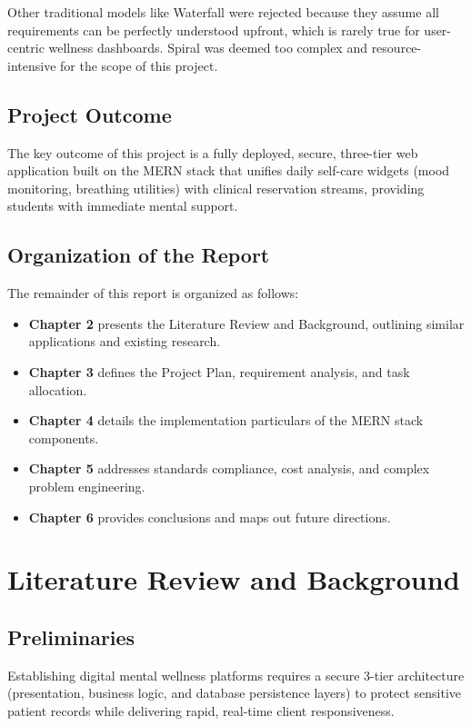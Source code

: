 \documentclass[a4paper,11pt]{report}
\begin{document}
Other traditional models like Waterfall were rejected because they assume all requirements can be perfectly understood upfront, which is rarely true for user-centric wellness dashboards. Spiral was deemed too complex and resource-intensive for the scope of this project.

\section{Project Outcome}
The key outcome of this project is a fully deployed, secure, three-tier web application built on the MERN stack that unifies daily self-care widgets (mood monitoring, breathing utilities) with clinical reservation streams, providing students with immediate mental support.

\section{Organization of the Report}
The remainder of this report is organized as follows:
\begin{itemize}
    \item \textbf{Chapter 2} presents the Literature Review and Background, outlining similar applications and existing research.
    \item \textbf{Chapter 3} defines the Project Plan, requirement analysis, and task allocation.
    \item \textbf{Chapter 4} details the implementation particulars of the MERN stack components.
    \item \textbf{Chapter 5} addresses standards compliance, cost analysis, and complex problem engineering.
    \item \textbf{Chapter 6} provides conclusions and maps out future directions.
\end{itemize}

\chapter{Literature Review and Background}

\section{Preliminaries}
Establishing digital mental wellness platforms requires a secure 3-tier architecture (presentation, business logic, and database persistence layers) to protect sensitive patient records while delivering rapid, real-time client responsiveness.
\end{document}
